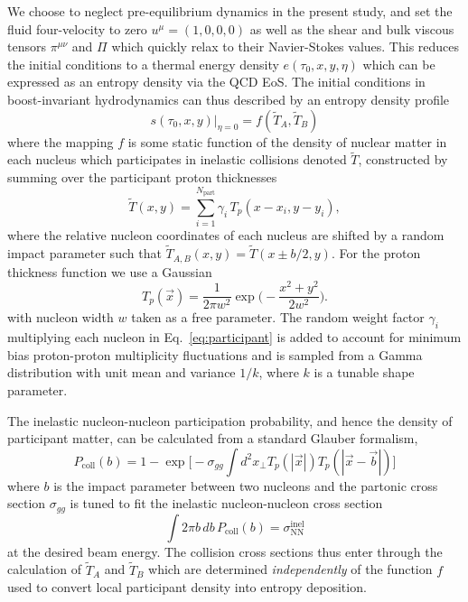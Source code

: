 \documentclass[aps,prc,reprint,amsmath,nofootinbib,superscriptaddress]{revtex4-1}
\newcommand{\T}{\tilde{T}}
\begin{document}
We choose to neglect pre-equilibrium dynamics in the present study, and set the fluid four-velocity to zero ${u^\mu = (1,0,0,0)}$ as well as the shear and bulk viscous tensors $\pi^{\mu\nu}$ and $\Pi$ which quickly relax to their Navier-Stokes values. This reduces the initial conditions to a thermal energy density $e(\tau_0, x, y, \eta)$ which can be expressed as an entropy density via the QCD EoS. The initial conditions in boost-invariant hydrodynamics can thus described by an entropy density profile
\begin{equation}
  s(\tau_0, x, y)\vert_{\eta=0} = f(\T_A, \T_B)
  \label{eq:mapping}
\end{equation}
where the mapping $f$ is some static function of the density of nuclear matter in each nucleus which participates in inelastic collisions denoted $\T$, constructed by summing over the participant proton thicknesses
\begin{equation}
  \T(x, y) = \sum\limits_{i=1}^{N_\text{part}} \gamma_i\, T_p(x - x_i, y - y_i),
  \label{eq:participant}
\end{equation}
where the relative nucleon coordinates of each nucleus are shifted by a random impact parameter such that ${\T_{A,B}(x, y) = \T(x \pm b/2, y)}$. For the proton thickness function we use a Gaussian
\begin{equation}
  T_p(\vec{x}) = \frac{1}{2\pi w^2} \exp\bigg(\!-\frac{x^2 + y^2}{2 w^2}\bigg).
\end{equation}
with nucleon width $w$ taken as a free parameter. The random weight factor $\gamma_i$ multiplying each nucleon in Eq.~\eqref{eq:participant} is added to account for minimum bias proton-proton multiplicity fluctuations and is sampled from a Gamma distribution with unit mean and variance $1/k$, where $k$ is a tunable shape parameter.

The inelastic nucleon-nucleon participation probability, and hence the density of participant matter, can be calculated from a standard Glauber formalism,
\begin{equation}
  P_\text{coll}(b) =
    1 - \exp\biggl[
      -\sigma_{gg} \int d^2x_\perp T_p(|\vec{x}|) T_p(|\vec{x} - \vec{b}|)
    \biggr]
\end{equation}
where $b$ is the impact parameter between two nucleons and the partonic cross section $\sigma_{gg}$ is tuned to fit the inelastic nucleon-nucleon cross section
\begin{equation}
  \int 2 \pi b\, db\, P_\text{coll}(b) = \sigma_\text{NN}^\text{inel}
\end{equation}
at the desired beam energy. The collision cross sections thus enter through the calculation of $\T_A$ and $\T_B$ which are determined \emph{independently} of the function $f$ used to convert local participant density into entropy deposition.
\end{document}
